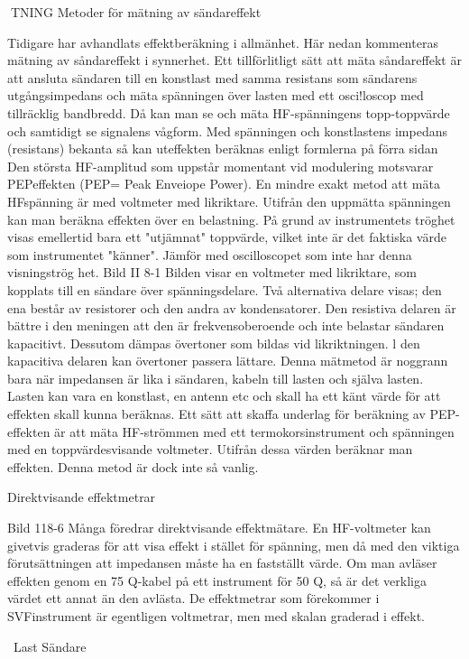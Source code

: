 \documentclass[a4paper,twoside,twocolumn,openright]{book}
\begin{document}
{{{{{TNING
Metoder för mätning av sändareffekt

Tidigare har avhandlats effektberäkning i
allmänhet. Här nedan kommenteras mätning av såndareffekt i synnerhet.
Ett tillförlitligt sätt att mäta såndareffekt är
att ansluta sändaren till en konstlast med
samma resistans som sändarens utgångsimpedans och mäta spänningen över lasten
med ett osci!loscop med tillräcklig bandbredd. Då kan man se och mäta HF-spänningens topp-toppvärde och samtidigt se
signalens vågform.
Med spänningen och konstlastens impedans (resistans) bekanta så kan uteffekten
beräknas enligt formlerna på förra sidan
Den största HF-amplitud som uppstår
momentant vid modulering motsvarar PEPeffekten (PEP= Peak Enveiope Power).
En mindre exakt metod att mäta HFspänning är med voltmeter med likriktare.
Utifrån den uppmätta spänningen kan man
beräkna effekten över en belastning. På
grund av instrumentets tröghet visas emellertid bara ett "utjämnat" toppvärde, vilket
inte är det faktiska värde som instrumentet
"känner". Jämför med oscilloscopet som inte
har denna visningströg het.
Bild II 8-1
Bilden visar en voltmeter med likriktare,
som kopplats till en sändare över spänningsdelare. Två alternativa delare visas; den ena
består av resistorer och den andra av kondensatorer.
Den resistiva delaren är bättre i den meningen att den är frekvensoberoende och
inte belastar sändaren kapacitivt. Dessutom
dämpas övertoner som bildas vid likriktningen. l den kapacitiva delaren kan övertoner
passera lättare.
Denna mätmetod är noggrann bara när
impedansen är lika i sändaren, kabeln till
lasten och själva lasten. Lasten kan vara en
konstlast, en antenn etc och skall ha ett känt
värde för att effekten skall kunna beräknas.
Ett sätt att skaffa underlag för beräkning
av PEP-effekten är att mäta HF-strömmen
med ett termokorsinstrument och spänningen med en toppvärdesvisande voltmeter.
Utifrån dessa värden beräknar man effekten. Denna metod är dock inte så vanlig.

Direktvisande effektmetrar

Bild 118-6
Många föredrar direktvisande effektmätare.
En HF-voltmeter kan givetvis graderas för
att visa effekt i stället för spänning, men då
med den viktiga förutsättningen att impedansen måste ha en fastställt värde.
Om man avläser effekten genom en 75
Q-kabel på ett instrument för 50 Q, så är det
verkliga värdet ett annat än den avlästa.
De effektmetrar som förekommer i SVFinstrument är egentligen voltmetrar, men
med skalan graderad i effekt.

~Last
Sändare~

}}}}}
\end{document}
